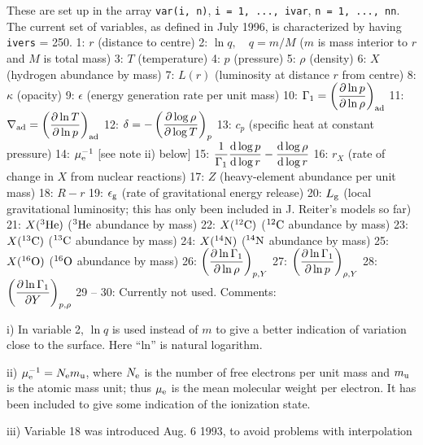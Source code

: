 These are set up in the array {\tt var(i, n)}, 
{\tt i = 1, ..., ivar}, {\tt n = 1, ..., nn}.
The current set of variables, as defined in July 1996,
is characterized by having {\tt ivers} = 250.
\medskip
{\obeylines\parskip=2pt
 1: $r$ (distance to centre)
 2: $\ln q , \quad  q = m/M$ ($m$ is mass interior to $r$ and $M$ is total mass)
 3: $T$ (temperature)
 4: $p$ (pressure)
 5: $\rho$ (density)
 6: $X$ (hydrogen abundance by mass)
 7: $L(r)$ (luminosity at distance $r$ from centre)
 8: $\kappa$ (opacity)
 9: $\epsilon$ (energy generation rate per unit mass)
10: $\displaystyle {\Gamma_1 = %
\left({\partial \ln p \over \partial \ln \rho} \right)_{\rm ad}}$
11: $\displaystyle{\nabla_{\rm ad} = %
\left({ \partial \ln T \over \partial \ln p} \right)_{\rm ad}}$
12: $\displaystyle{\delta = %
- \left( {\partial \log \rho  \over \partial \log T} \right)_p}$
13: $c_p$ (specific heat at constant pressure)
14: $\mu_{\rm e}^{-1}$ [see note ii) below]
15: $ \displaystyle{{1 \over \Gamma_1} {\dd  \log p  \over \dd \log r} - %
{\dd  \log \rho  \over \dd \log r}}$
16: $r_X$ (rate of change in $X$ from nuclear reactions)
17: $Z$ (heavy-element abundance per unit mass)
18: $R - r$
19: $\epsilon_{\rm g}$ (rate of gravitational energy release)
20: $L_{\rm g}$ (local gravitational luminosity; this has only %
been included in J. Reiter's models so far)
21: $X({}^3{\rm He})$ (${}^3{\rm He}$ abundance by mass)
22: $X({}^{12}{\rm C})$ (${}^{12}{\rm C}$ abundance by mass)
23: $X({}^{13}{\rm C})$ (${}^{13}{\rm C}$ abundance by mass)
24: $X({}^{14}{\rm N})$ (${}^{14}{\rm N}$ abundance by mass)
25: $X({}^{16}{\rm O})$ (${}^{16}{\rm O}$ abundance by mass)
26: $\displaystyle \left({\partial \ln \Gamma_1 \over \partial \ln \rho} %
     \right)_{p, Y}$
27: $\displaystyle \left({\partial \ln \Gamma_1 \over \partial \ln p} %
     \right)_{\rho, Y}$
28: $\displaystyle \left({\partial \ln \Gamma_1 \over \partial Y} %
     \right)_{p, \rho}$
29 -- 30: Currently not used.
}
\medskip\noindent
Comments:
\medskip
\item{i)}
In variable 2, $\ln q$ is used instead of $m$ to give a better
indication of variation close to the surface.
Here ``ln'' is natural logarithm.
\item{ii)}
$\mu_{\rm e}^{-1} = N_{\rm e} m_{\rm u}$,
where $N_{\rm e}$ is the number of free electrons per unit mass
and $m_{\rm u}$ is the atomic mass unit;
thus $\mu_{\rm e}$ is the mean molecular weight per electron.
It has been included to give some indication of the ionization state.
\item{iii)} 
Variable 18 was introduced Aug. 6 1993, to avoid problems with interpolation
